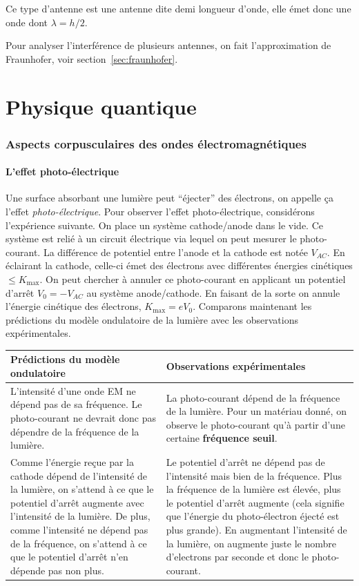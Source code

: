 Ce type d'antenne est une antenne dite demi longueur d'onde, elle émet
donc une onde dont $\lambda = h/2$.

Pour analyser l'interférence de plusieurs antennes,
on fait l'approximation de Fraunhofer, voir section~\ref{sec:fraunhofer}.



\part{Physique quantique}
\section{Aspects corpusculaires des ondes électromagnétiques}
\subsection{L'effet photo-électrique}
Une surface absorbant une lumière peut ``éjecter'' des électrons,
on appelle ça l'effet \emph{photo-électrique}.
Pour observer l'effet photo-électrique, considérons l'expérience
suivante. On place un système cathode/anode dans le vide. Ce système
est relié à un circuit électrique via lequel on peut mesurer le
photo-courant. La différence de potentiel entre l'anode et la
cathode est notée $V_{AC}$. En éclairant la cathode, celle-ci émet
des électrons avec différentes énergies cinétiques $\leq K_{\text{max}}$.
On peut chercher à annuler ce photo-courant en applicant un potentiel
d'arrêt $V_0 = -V_{AC}$ au système anode/cathode. En faisant de la sorte
on annule l'énergie cinétique des électrons, $K_{\text{max}} = eV_0$.
Comparons maintenant les prédictions du modèle ondulatoire de la lumière
avec les observations expérimentales.

\begin{tabular}{p{}|p{}}
	\textbf{Prédictions du modèle ondulatoire} & \textbf{Observations expérimentales} \\
	\hline
	L'intensité d'une onde EM ne dépend pas de sa fréquence. Le photo-courant
	ne devrait donc pas dépendre de la fréquence de la lumière.
	& La photo-courant dépend de la fréquence de la lumière. Pour un
	matériau donné, on observe le photo-courant qu'à partir d'une
	certaine \textbf{fréquence seuil}. \\
	\hline
	Comme l'énergie reçue par la cathode dépend de l'intensité de la lumière,
	on s'attend à ce que le potentiel d'arrêt augmente avec l'intensité
	de la lumière. De plus, comme l'intensité ne dépend pas de la fréquence,
	on s'attend à ce que le potentiel d'arrêt n'en dépende pas non plus.
	& Le potentiel d'arrêt ne dépend pas de l'intensité mais bien de la
	fréquence. Plus la fréquence de la lumière est élevée, plus le potentiel
	d'arrêt augmente (cela signifie que l'énergie du photo-électron éjecté
	est plus grande). En augmentant l'intensité de la lumière, on augmente juste
	le nombre d'electrons par seconde et donc le photo-courant.
\end{tabular}

